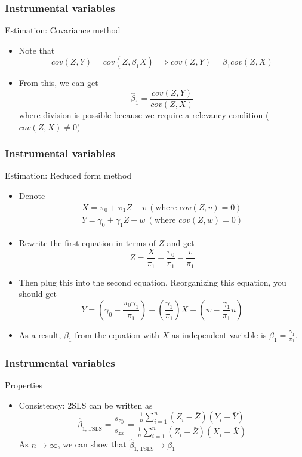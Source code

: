 \documentclass[compress]{beamer}
\begin{document}
\begin{frame}
\frametitle{Instrumental variables}
Estimation: Covariance method
\begin{itemize}
\item Note that
\[
cov(Z,Y)=cov(Z,\beta_1X) \implies cov(Z,Y)=\beta_1cov(Z,X)
\]
\item From this, we can get
\[
\hat{\beta}_1=\frac{cov(Z,Y)}{cov(Z,X)}
\]
where division is possible because we require a relevancy condition ($cov(Z,X)\neq0$)
\end{itemize}
\end{frame}

\begin{frame}
\frametitle{Instrumental variables}
Estimation: Reduced form method
\begin{itemize}
\item Denote 
\begin{gather*}
X=\pi_0+\pi_1Z+v \ (\text{where }cov(Z,v)=0)\\ Y=\gamma_0+\gamma_1Z+w \ (\text{where }cov(Z,w)=0)
\end{gather*}
\item Rewrite the first equation in terms of $Z$ and get
\[
Z=\frac{X}{\pi_1}-\frac{\pi_0}{\pi_1}-\frac{v}{\pi_1}
\]
\item Then plug this into the second equation. Reorganizing this equation, you should get
\[
Y=\left(\gamma_0-\frac{\pi_0\gamma_1}{\pi_1}\right)+\left(\frac{\gamma_1}{\pi_1}\right)X+\left(w-\frac{\gamma_1}{\pi_1}u\right)
\]
\item As a result, $\beta_1$ from the equation with $X$ as independent variable is $\beta_1 = \frac{\gamma_1}{\pi_1}$. 
\end{itemize}
\end{frame}


\begin{frame}
\frametitle{Instrumental variables}
Properties
\begin{itemize}
\item Consistency: 2SLS can be written as
\[
\hat{\beta}_{1,\text{TSLS}}=\frac{s_{zy}}{s_{zx}}=\frac{\frac{1}{n}\sum_{i=1}^n(Z_i-\bar{Z})(Y_i-\bar{Y})}{\frac{1}{n}\sum_{i=1}^n(Z_i-\bar{Z})(X_i-\bar{X})}
\]
As $n\to\infty$, we can show that $\hat{\beta}_{1,\text{TSLS}}\to\beta_1$
\end{itemize}
\end{frame}
\end{document}
